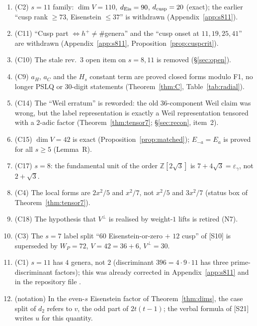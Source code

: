 \documentclass[11pt]{article}
\theoremstyle{definition}
\newcommand{\Z}{\mathbb{Z}}
\newcommand{\src}[1]{\textup{[S#1]}}
\begin{document}
\begin{enumerate}[label=\textbf{R4.\arabic*},leftmargin=3.2em]
\item (C2) $s=11$ family: $\dim V=110$, $d_{\rm Eis}=90$, $d_{\rm cusp}=20$ (exact); the earlier ``cusp rank $\ge73$, Eisenstein $\le37$'' is withdrawn (Appendix~\ref{app:s811}).
\item (C11) ``Cusp part $\Leftrightarrow h^+\neq\#$genera'' and the ``cusp onset at $11,19,25,41$'' are withdrawn (Appendix~\ref{app:s811}, Proposition~\ref{prop:cuspcrit}).
\item (C10) The stale rev.~3 open item on $s=8,11$ is removed (\S\ref{sec:open}).
\item (C9) $a_H$, $a_C$ and the $H_s$ constant term are proved closed forms modulo F1, no longer PSLQ or 30-digit statements (Theorem~\ref{thm:C}, Table~\ref{tab:radial}).
\item (C14) The ``Weil erratum'' is reworded: the old $36$-component Weil claim was wrong, but the label representation is exactly a Weil representation tensored with a
$2$-adic factor (Theorem~\ref{thm:tensor7}; \S\ref{sec:recon}, item~2).
\item (C15) $\dim V=42$ is exact (Proposition~\ref{prop:matched}); $E_{-a}=E_a$ is proved for all $s\ge5$ (Lemma~R).
\item (C17) $s=8$: the fundamental unit of the order $\Z[2\sqrt3]$ is $7+4\sqrt3=\varepsilon_\gamma$, not $2+\sqrt3$.
\item (C4) The local forms are $2x^2/5$ and $x^2/7$, not $x^2/5$ and $3x^2/7$ (status box of Theorem~\ref{thm:tensor7}).
\item (C18) The hypothesis that $V^\perp$ is realised by weight-$1$ lifts is retired (N7).
\item (C3) The $s=7$ label split ``$60$ Eisenstein-or-zero $+$ $12$ cusp'' of \src{10} is superseded by $W_P=72$, $V=42=36+6$, $V^\perp=30$.
\item (C1) $s=11$ has $4$ genera, not $2$ (discriminant $396=4\cdot9\cdot11$ has three prime-discriminant factors); this was already corrected in Appendix~\ref{app:s811} and in the repository file .
\item (notation) In the even-$s$ Eisenstein factor of Theorem~\ref{thm:dims}, the case split of $d_2$ refers to $v$, the odd part of $2t(t-1)$; the verbal formula of \src{21} writes $u$ for this quantity.
\end{enumerate}
\end{document}
